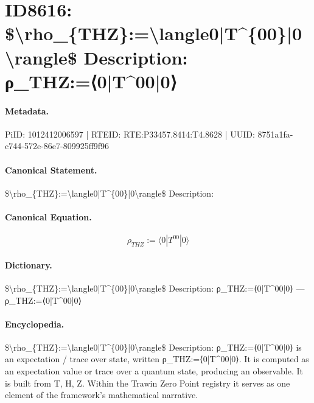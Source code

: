 \section*{ID8616: \$\textbackslash{}rho\_\{THZ\}:=\textbackslash{}langle0|T\textasciicircum{}\{00\}|0\textbackslash{}rangle\$ Description: ρ\_THZ:=⟨0|T\textasciicircum{}00|0⟩}
\paragraph{Metadata.}
PiID: 1012412006597 | RTEID: RTE:P33457.8414:T4.8628 | UUID: 8751a1fa-c744-572e-86e7-809925ff9f96

\paragraph{Canonical Statement.}
\$\textbackslash{}rho\_\{THZ\}:=\textbackslash{}langle0|T\textasciicircum{}\{00\}|0\textbackslash{}rangle\$ Description:

\paragraph{Canonical Equation.}
\[
\rho_{THZ}:=\langle0|T^{00}|0\rangle
\]

\paragraph{Dictionary.}
\$\textbackslash{}rho\_\{THZ\}:=\textbackslash{}langle0|T\textasciicircum{}\{00\}|0\textbackslash{}rangle\$ Description: ρ\_THZ:=⟨0|T\textasciicircum{}00|0⟩ — ρ\_THZ:=⟨0|T\textasciicircum{}00|0⟩

\paragraph{Encyclopedia.}
\$\textbackslash{}rho\_\{THZ\}:=\textbackslash{}langle0|T\textasciicircum{}\{00\}|0\textbackslash{}rangle\$ Description: ρ\_THZ:=⟨0|T\textasciicircum{}00|0⟩ is an expectation / trace over state, written ρ\_THZ:=⟨0|T\textasciicircum{}00|0⟩. It is computed as an expectation value or trace over a quantum state, producing an observable. It is built from T, H, Z. Within the Trawin Zero Point registry it serves as one element of the framework's mathematical narrative.
